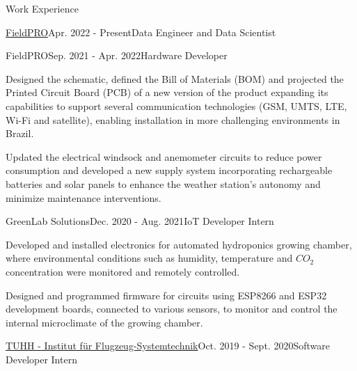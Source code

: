 \documentclass{resume} %
\begin{document}
\begin{rSection}{Work Experience}
\begin{rSubsection}{\href{https://fieldpro.com.br/}{FieldPRO}}{Apr. 2022 - Present}{Data Engineer and Data Scientist}{}
\end{rSubsection}

\vspace{-0.2cm}

\begin{rSubsection}{FieldPRO}{Sep. 2021 - Apr. 2022}{Hardware Developer}{}

\item Designed the schematic, defined the Bill of Materials (BOM) and projected the Printed Circuit Board (PCB) of a new version of the product expanding its capabilities to support several communication technologies (GSM, UMTS, LTE, Wi-Fi and satellite), enabling installation in more challenging environments in Brazil.
\item Updated the electrical windsock and anemometer circuits to reduce power consumption and developed a new supply system incorporating rechargeable batteries and solar panels to enhance the weather station's autonomy and minimize maintenance interventions.
\end{rSubsection}

\vspace{-0.2cm}

\begin{rSubsection}{GreenLab Solutions}{Dec. 2020 - Aug. 2021}{IoT Developer Intern}{}

\item Developed and installed electronics for automated hydroponics growing chamber, where environmental conditions such as humidity, temperature and $CO_{2}$ concentration were monitored and remotely controlled.
\item Designed and programmed firmware for circuits using ESP8266 and ESP32 development boards, connected to various sensors, to monitor and control the internal microclimate of the growing chamber.
\end{rSubsection}

\vspace{-0.2cm}

\begin{rSubsection}{\href{https://www.fst.tu-harburg.de/institut/willkommen}{TUHH - Institut f\"ur Flugzeug-Systemtechnik}}{Oct. 2019 - Sept. 2020}{Software Developer Intern}{}


\end{rSubsection}
\end{rSection}
\end{document}
